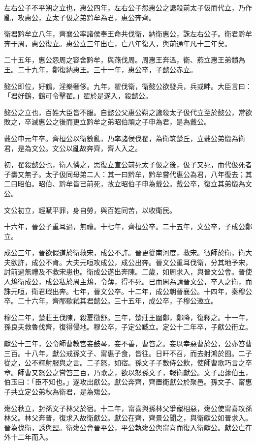 \begin{pinyinscope}
左右公子不平朔之立也，惠公四年，左右公子怨惠公之讒殺前太子伋而代立，乃作亂，攻惠公，立太子伋之弟黔牟為君，惠公奔齊。

衛君黔牟立八年，齊襄公率諸侯奉王命共伐衛，納衛惠公，誅左右公子。衛君黔牟奔于周，惠公復立。惠公立三年出亡，亡八年復入，與前通年凡十三年矣。

二十五年，惠公怨周之容舍黔牟，與燕伐周。周惠王奔溫，衛、燕立惠王弟穨為王。二十九年，鄭復納惠王。三十一年，惠公卒，子懿公赤立。

懿公即位，好鶴，淫樂奢侈。九年，翟伐衛，衛懿公欲發兵，兵或畔。大臣言曰：「君好鶴，鶴可令擊翟。」翟於是遂入，殺懿公。

懿公之立也，百姓大臣皆不服。自懿公父惠公朔之讒殺太子伋代立至於懿公，常欲敗之，卒滅惠公之後而更立黔牟之弟昭伯頑之子申為君，是為戴公。

戴公申元年卒。齊桓公以衛數亂，乃率諸侯伐翟，為衛筑楚丘，立戴公弟燬為衛君，是為文公。文公以亂故奔齊，齊人入之。

初，翟殺懿公也，衛人憐之，思復立宣公前死太子伋之後，伋子又死，而代伋死者子壽又無子。太子伋同母弟二人：其一曰黔牟，黔牟嘗代惠公為君，八年復去；其二曰昭伯。昭伯、黔牟皆已前死，故立昭伯子申為戴公。戴公卒，復立其弟燬為文公。

文公初立，輕賦平罪，身自勞，與百姓同苦，以收衛民。

十六年，晉公子重耳過，無禮。十七年，齊桓公卒。二十五年，文公卒，子成公鄭立。

成公三年，晉欲假道於衛救宋，成公不許。晉更從南河度，救宋。徵師於衛，衛大夫欲許，成公不肯。大夫元咺攻成公，成公出奔。晉文公重耳伐衛，分其地予宋，討前過無禮及不救宋患也。衛成公遂出奔陳。二歲，如周求入，與晉文公會。晉使人鴆衛成公，成公私於周主鴆，令薄，得不死。已而周為請晉文公，卒入之衛，而誅元咺，衛君瑕出奔。七年，晉文公卒。十二年，成公朝晉襄公。十四年，秦穆公卒。二十六年，齊邴歜弒其君懿公。三十五年，成公卒，子穆公遫立。

穆公二年，楚莊王伐陳，殺夏徵舒。三年，楚莊王圍鄭，鄭降，復釋之。十一年，孫良夫救魯伐齊，復得侵地。穆公卒，子定公臧立。定公十二年卒，子獻公衎立。

獻公十三年，公令師曹教宮妾鼓琴，妾不善，曹笞之。妾以幸惡曹於公，公亦笞曹三百。十八年，獻公戒孫文子、甯惠子食，皆往。日旰不召，而去射鴻於囿。二子從之，公不釋射服與之言。二子怒，如宿。孫文子子數侍公飲，使師曹歌巧言之卒章。師曹又怒公之嘗笞三百，乃歌之，欲以怒孫文子，報衛獻公。文子語蘧伯玉，伯玉曰：「臣不知也。」遂攻出獻公。獻公奔齊，齊置衛獻公於聚邑。孫文子、甯惠子共立定公弟秋為衛君，是為殤公。

殤公秋立，封孫文子林父於宿。十二年，甯喜與孫林父爭寵相惡，殤公使甯喜攻孫林父。林父奔晉，復求入故衛獻公。獻公在齊，齊景公聞之，與衛獻公如晉求入。晉為伐衛，誘與盟。衛殤公會晉平公，平公執殤公與甯喜而復入衛獻公。獻公亡在外十二年而入。


\end{pinyinscope}
